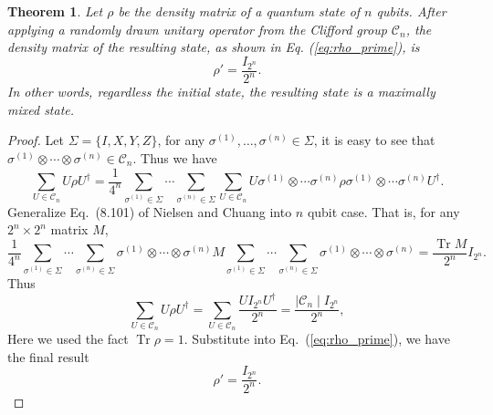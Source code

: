 \documentclass{article}
\DeclareMathOperator{\Tr}{Tr}
\newtheorem{theorem}{Theorem}
\begin{document}
\begin{theorem}
  Let $\rho$ be the density matrix of a quantum state of $n$ qubits.
  After applying a randomly drawn unitary operator from the Clifford group
  $\mathcal C_n$, the density matrix of the resulting state, as shown in
  Eq. (\ref{eq:rho_prime}), is
  \begin{equation}
    \rho' = \frac{I_{2^n}}{2^n}.
  \end{equation}
  In other words, regardless the initial state, the resulting state is a
  maximally mixed state.
\end{theorem}
\begin{proof}
  Let $\Sigma = \{I, X, Y, Z\}$,
  for any $\sigma^{(1)}, \ldots, \sigma^{(n)}\in\Sigma$, it is easy to
  see that  $\sigma^{(1)}\otimes\cdots\otimes\sigma^{(n)}\in \mathcal C_n$.
  Thus we have
  \begin{equation}
    \sum_{U\in\mathcal C_n} U\rho U^\dagger =
    \frac{1}{4^n}\sum_{\sigma^{(1)}\in\Sigma}\cdots\sum_{\sigma^{(n)}\in\Sigma}\sum_{U\in\mathcal C_n}
    U\sigma^{(1)}\otimes\cdots\sigma^{(n)}\rho\sigma^{(1)}\otimes\cdots\sigma^{(n)}U^\dagger.
  \end{equation}
  Generalize Eq.~(8.101) of 
  Nielsen and Chuang\cite{Nielsen_Chuang_2010} into $n$ qubit case.
  That is, for any $2^n\times2^n$ matrix $M$,
  \begin{equation}
    \frac{1}{4^n}\sum_{\sigma^{(1)}\in\Sigma}\cdots\sum_{\sigma^{(n)}\in\Sigma}
    \sigma^{(1)}\otimes\cdots\otimes\sigma^{(n)}M
    \sum_{\sigma^{(1)}\in\Sigma}\cdots\sum_{\sigma^{(n)}\in\Sigma}
    \sigma^{(1)}\otimes\cdots\otimes\sigma^{(n)} = \frac{\Tr M}{2^n}I_{2^n}.
    \label{eq:sum_Sigma}
  \end{equation}
  Thus
  \begin{equation}
    \sum_{U\in\mathcal C_n}U\rho U^\dagger
    = \sum_{U\in\mathcal C_n}\frac{UI_{2^n}U^\dagger}{2^n}
    = \frac{\mid\mathcal C_n\mid I_{2^n}}{2^n},
  \end{equation}
  Here we used the fact $\Tr\rho = 1$.  Substitute into Eq.~(\ref{eq:rho_prime}),
  we have the final result
  \begin{equation}
    \rho' = \frac{I_{2^n}}{2^n}.
  \end{equation}
\end{proof}

\appendix
\end{document}
